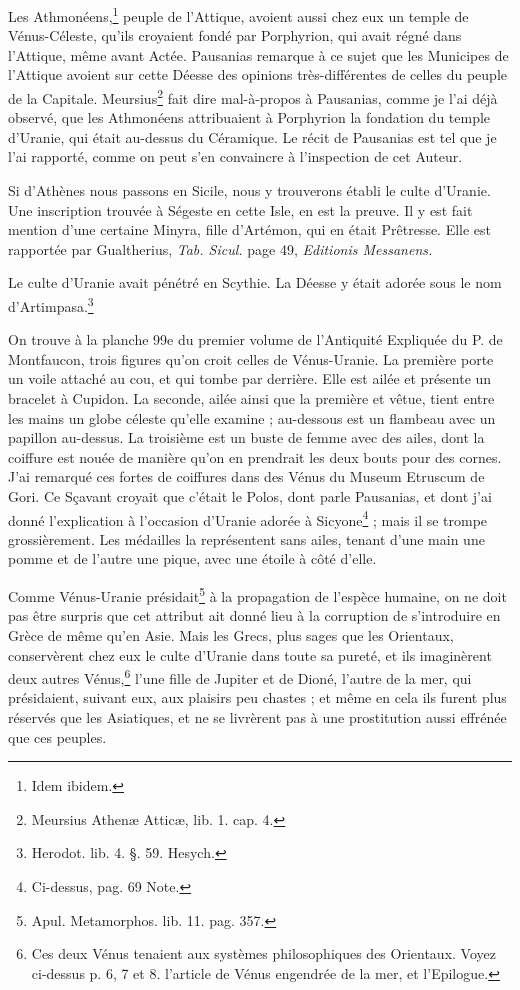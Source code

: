 \documentclass[a4paper, 18pt, oneside]{article}
\begin{document}
Les Athmonéens,\footnote{Idem ibidem.} peuple de l'Attique, avoient aussi chez eux un temple de Vénus-Céleste, qu'ils croyaient fondé par Porphyrion, qui avait régné dans l'Attique, même avant Actée. Pausanias remarque à ce sujet que les Municipes de l'Attique avoient sur cette Déesse des opinions très-différentes de celles du peuple de la Capitale. Meursius\footnote{Meursius Athenæ Atticæ, lib. 1. cap. 4.} fait dire mal-à-propos à Pausanias, comme je l'ai déjà observé, que les Athmonéens attribuaient à Porphyrion la fondation du temple d'Uranie, qui était au-dessus du Céramique. Le récit de Pausanias est tel que je l'ai rapporté, comme on peut s'en convaincre à l'inspection de cet Auteur.

Si d'Athènes nous passons en Sicile, nous y trouverons établi le culte d'Uranie. Une inscription trouvée à Ségeste en cette Isle, en est la preuve. Il y est fait mention d'une certaine Minyra, fille d'Artémon, qui en était Prêtresse. Elle est rapportée par Gualtherius, \emph{Tab. Sicul.} page 49, \emph{Editionis Messanens.}

Le culte d'Uranie avait pénétré en Scythie. La Déesse y était adorée sous le nom d'Artimpasa.\footnote{Herodot. lib. 4. §. 59. Hesych.}

On trouve à la planche 99e du premier volume de l'Antiquité Expliquée du P. de Montfaucon, trois figures qu'on croit celles de Vénus-Uranie. La première porte un voile attaché au cou, et qui tombe par derrière. Elle est ailée et présente un bracelet à Cupidon. La seconde, ailée ainsi que la première et vêtue, tient entre les mains un globe céleste qu'elle examine ; au-dessous est un flambeau avec un papillon au-dessus. La troisième est un buste de femme avec des ailes, dont la coiffure est nouée de manière qu'on en prendrait les deux bouts pour des cornes. J'ai remarqué ces fortes de coiffures dans des Vénus du Museum Etruscum de Gori. Ce Sçavant croyait que c'était le Polos, dont parle Pausanias, et dont j'ai donné l'explication à l'occasion d'Uranie adorée à Sicyone\footnote{Ci-dessus, pag. 69 Note.} ; mais il se trompe grossièrement. Les médailles la représentent sans ailes, tenant d'une main une pomme et de l'autre une pique, avec une étoile à côté d'elle.

Comme Vénus-Uranie présidait\footnote{Apul. Metamorphos. lib. 11. pag. 357.} à la propagation de l'espèce humaine, on ne doit pas être surpris que cet attribut ait donné lieu à la corruption de s'introduire en Grèce de même qu'en Asie. Mais les Grecs, plus sages que les Orientaux, conservèrent chez eux le culte d'Uranie dans toute sa pureté, et ils imaginèrent deux autres Vénus,\footnote{Ces deux Vénus tenaient aux systèmes philosophiques des Orientaux. Voyez ci-dessus p. 6, 7 et 8. l'article de Vénus engendrée de la mer, et l'Epilogue.} l'une fille de Jupiter et de Dioné, l'autre de la mer, qui présidaient, suivant eux, aux plaisirs peu chastes ; et même en cela ils furent plus réservés que les Asiatiques, et ne se livrèrent pas à une prostitution aussi effrénée que ces peuples.
\end{document}
